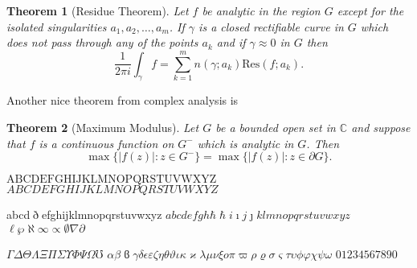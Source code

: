 \documentclass{article}
\newtheorem{theorem}{Theorem}
\begin{document}
\begin{theorem}[Residue Theorem]
Let $f$ be analytic in the region $G$ except for the isolated singularities $a_1,a_2,\ldots,a_m$. If $\gamma$ is a closed rectifiable curve in $G$ which does not pass through any of the points $a_k$ and if $\gamma\approx 0$ in $G$ then
\[
\frac{1}{2\pi i}\int_\gamma f = \sum_{k=1}^m n(\gamma;a_k) \text{Res}(f;a_k).
\]
\end{theorem}

Another nice theorem from complex analysis is

\begin{theorem}[Maximum Modulus]
Let $G$ be a bounded open set in $\mathbb{C}$ and suppose that $f$ is a continuous function on $G^-$ which is analytic in $G$. Then
\[
\max\{|f(z)|:z\in G^-\}=\max \{|f(z)|:z\in \partial G \}.
\]
\end{theorem}

\newcommand{\abc}{abcdefgh\hbar\hslash i\imath j\jmath klmnopqrstuvwxyz}
\newcommand{\ABC}{ABCDEFGHIJKLMNOPQRSTUVWXYZ}
\newcommand{\alphabeta}{\alpha\beta\varbeta\gamma\delta\epsilon\varepsilon\zeta\eta\theta\vartheta\iota\kappa\varkappa\lambda\mu\nu\xi o\pi\varpi\rho\varrho\sigma\varsigma\tau\upsilon\phi\varphi\chi\psi\omega}
\newcommand{\AlphaBeta}{\Gamma\Delta\Theta\Lambda\Xi\Pi\Sigma\Upsilon\Phi\Psi\Omega}

$\mathrm{\ABC}$ \qquad $\ABC$

abcd$\eth$efghijklmnopqrstuvwxyz \qquad $\abc$ \quad $\ell\wp\aleph\infty\propto\emptyset\nabla\partial$

$\AlphaBeta\mho$ \qquad $\alphabeta$ \qquad $01234567890$
\end{document}
